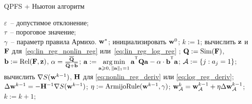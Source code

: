 \begin{algorithm}
	\caption{QPFS + Ньютон алгоритм}
	\label{pc:QPFSNewton}
	\begin{algorithmic}
		\REQUIRE $\varepsilon$~-- допустимое отклонение;\\
		\hspace{1.07cm}$\tau$~-- пороговое значение;\\
		\hspace{1.07cm}$\gamma$~-- параметр правила Армихо.
		\ENSURE $\mathbf{w}^*$;
		\STATE  инициализировать $\mathbf{w}^0$;
		\STATE $k := 1$;
		\REPEAT
		\STATE вычислить $\mathbf{z}$ и $\mathbf{F}$ для~\eqref{eq:lin_reg_nonlin_reg} или~\eqref{eq:lin_reg_log_reg} ;
		\vspace{0.1cm}
		\STATE $\mathbf{Q} := \text{Sim} (\mathbf{F})$, $\mathbf{b} := \text{Rel}(\mathbf{F}, \mathbf{z})$, $\alpha = \frac{\overline{\mathbf{Q}}}{\overline{\mathbf{Q}} + \overline{\mathbf{b}}}$;
		\vspace{0.1cm}
		\STATE $\ba := \argmin_{\ba \geq 0, \, \|\ba\|_1=1}\ba^{\T} \bQ \ba - \alpha \cdot \mathbf{b}^{\T} \ba$;
		\vspace{0.1cm}
		\STATE $\mathcal{A} := \{j: a_j = 1\}$;
		\vspace{0.1cm}
		\STATE вычислить $\nabla S(\mathbf{w}^{k-1})$, $\mathbf{H}$ для \eqref{eq:nonlin_reg_deriv} или \eqref{eq:log_reg_deriv};
		\vspace{0.1cm}
		\STATE $\Delta \mathbf{w}^{k-1} = - \mathbf{H}^{-1} \nabla S(\mathbf{w}^{k-1})$;
		\vspace{0.1cm}
		\STATE $\eta := \text{ArmijoRule}(\mathbf{w}^{k-1}, \gamma)$;
		\vspace{0.1cm}
		\STATE $\mathbf{w}_{\mathcal{A}}^k = \mathbf{w}_{\mathcal{A}}^{k - 1} + \eta \Delta \mathbf{w}_{\mathcal{A}}^{k - 1}$;
		\vspace{0.1cm}
		\STATE $k := k + 1$;
		\vspace{0.1cm}
	\end{algorithmic}
\end{algorithm}
